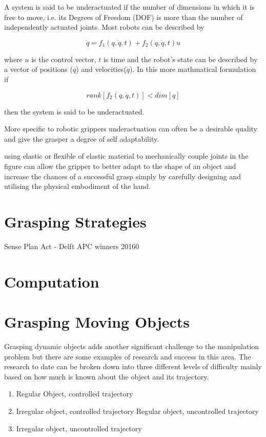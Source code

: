 A system is said to be underactuated if the number of dimensions in which it is free to move, i.e. its Degrees of Freedom (DOF) is more than the number of independently actuated joints. Most robots can be described by 

\begin{equation}
\ddot{q} = f_1(q,\dot{q},t) + f_2(q, \dot{q},t)u   
\end{equation}

where \(u\) is the control vector, \(t\) is time and the robot's state can be described by a vector of positions (\(q\)) and velocities(\(\dot{q}\)). In this more mathmatical formulation if 

\begin{equation}
    rank[f_2(q,\dot{q},t)] < dim[q]
\end{equation}

then the system is said to be underactuated.

More specific to robotic grippers underactuation can often be a desirable quality and give the grasper a degree of self adaptability.  

using elastic or flexible of elastic material to mechanically couple joints in the figure can allow the gripper to better adapt to the shape of an object and increase the chances of a successful grasp simply by carefully designing and utilising the physical embodiment of the hand.

\section{Grasping Strategies}
Sense Plan Act - Delft APC winners 20160

\section{Computation}

\section{Grasping Moving Objects}
Grasping dynamic objects adds another significant challenge to the manipulation problem but there are some examples of research and success in this area. The research to date can be broken down into three different levels of difficulty mainly based on how much is known about the object and its trajectory.

\begin{enumerate}
    \item Regular Object, controlled trajectory
    \item Irregular object, controlled trajectory
    \iten Regular object, uncontrolled trajectory
    \item Irregular object, uncontrolled trajectory 
\end{enumerate}

